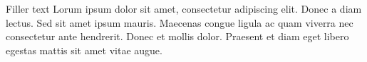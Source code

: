 
Filler text
Lorum ipsum dolor sit amet, consectetur adipiscing elit. Donec a diam lectus. Sed sit amet ipsum mauris. Maecenas congue ligula ac quam viverra nec consectetur ante hendrerit. Donec et mollis dolor. Praesent et diam eget libero egestas mattis sit amet vitae augue.

